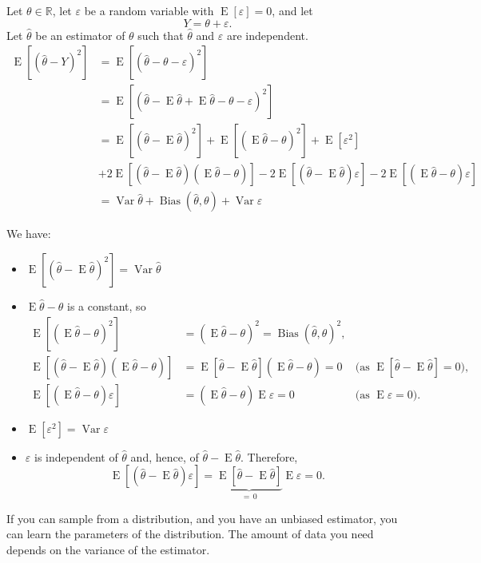 \documentclass[12pt]{amsart}
\renewcommand{\epsilon}{\varepsilon}
\renewcommand{\hat}{\widehat}
\newcommand{\RR}{\mathbb{R}}
\DeclareMathOperator{\Bias}{Bias}
\DeclareMathOperator{\EE}{E}
\DeclareMathOperator{\Var}{Var}
\begin{document}
 Let $\theta\in\RR$, let $\epsilon$ be a random variable with $\EE[\epsilon]=0$, and let
 \[
     Y = \theta + \epsilon.
\]
Let $\hat\theta$ be an estimator of $\theta$ such that $\hat\theta$ and $\epsilon$ are independent.
\begin{align*}
    \EE[(\hat\theta - Y)^2]
    &= \EE[(\hat\theta - \theta - \epsilon)^2]\\
    &= \EE[(\hat\theta - \EE\hat\theta + \EE\hat\theta - \theta - \epsilon)^2]\\
    &= \EE[(\hat\theta - \EE\hat\theta)^2] 
    + \EE[(\EE\hat\theta - \theta)^2] 
    + \EE[\epsilon^2]
    \\&+ 2\EE[(\hat\theta - \EE\hat\theta)(\EE\hat\theta - \theta)]
    - 2\EE[(\hat\theta - \EE\hat\theta)\epsilon]
    - 2\EE[(\EE\hat\theta - \theta)\epsilon]\\
    &= \Var \hat\theta + \Bias(\hat\theta,\theta) + \Var\epsilon
\end{align*}

We have:
\begin{itemize}
    \setlength\itemsep{0.5em}
    \item $\EE[(\hat\theta - \EE\hat\theta)^2] = \Var \hat\theta$
    \item $\EE\hat\theta - \theta$ is a constant, so
    \begin{align*}
        \EE[(\EE\hat\theta - \theta)^2] &= (\EE\hat\theta - \theta)^2 = \Bias(\hat\theta,\theta)^2,\\
        \EE[(\hat\theta - \EE\hat\theta)(\EE\hat\theta - \theta)] &= \EE[\hat\theta - \EE\hat\theta](\EE\hat\theta - \theta)=0 &\text{(as $\EE[\hat\theta - \EE\hat\theta]=0$),}\\
        \EE[(\EE\hat\theta - \theta)\epsilon] &= (\EE\hat\theta - \theta)
        \EE\epsilon=0&\text{(as $\EE\epsilon=0$).}
    \end{align*}
    \item $\EE[\epsilon^2]=\Var \epsilon$
    \item $\epsilon$ is independent of $\hat\theta$ and, hence, of $\hat\theta-\EE\hat\theta$.
    Therefore,
    \[\EE[(\hat\theta - \EE\hat\theta)\epsilon] = 
    \underbrace{\EE[\hat\theta - \EE\hat\theta]}_{=\,0}\EE\epsilon = 0.\]
\end{itemize}

If you can sample from a distribution, and you have an unbiased estimator, you can learn the parameters of the distribution. The amount of data you need depends on the variance of the estimator.
\end{document}
